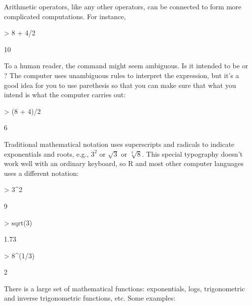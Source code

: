 Arithmetic operators, like any other operators, can be connected to
form more complicated computations.  For instance, 
\begin{Schunk}
\begin{Sinput}
> 8 + 4/2
\end{Sinput}
\begin{Soutput}
[1] 10
\end{Soutput}
\end{Schunk}
To a human reader, the command  might seem ambiguous.
Is it intended to be  or ?  The
computer uses unambiguous rules to interpret the expression, but it's
a good idea for you to use parethesis so that you can make sure that
what you intend is what the computer carries out:
\begin{Schunk}
\begin{Sinput}
> (8 + 4)/2
\end{Sinput}
\begin{Soutput}
[1] 6
\end{Soutput}
\end{Schunk}

Traditional mathematical notation uses superscripts and radicals to
indicate exponentials and roots, e.g., $3^2$ or $\sqrt{3}$ or
$\sqrt[3]{8}$.  This special typography doesn't work well with an
ordinary keyboard, so R and most other computer 
languages uses a different notation:
\begin{Schunk}
\begin{Sinput}
> 3^2
\end{Sinput}
\begin{Soutput}
[1] 9
\end{Soutput}
\begin{Sinput}
> sqrt(3)
\end{Sinput}
\begin{Soutput}
[1] 1.73
\end{Soutput}
\begin{Sinput}
> 8^(1/3)
\end{Sinput}
\begin{Soutput}
[1] 2
\end{Soutput}
\end{Schunk}

There is a large set of mathematical functions: exponentials, logs,
trigonometric and inverse trigonometric functions, etc.  Some examples:

